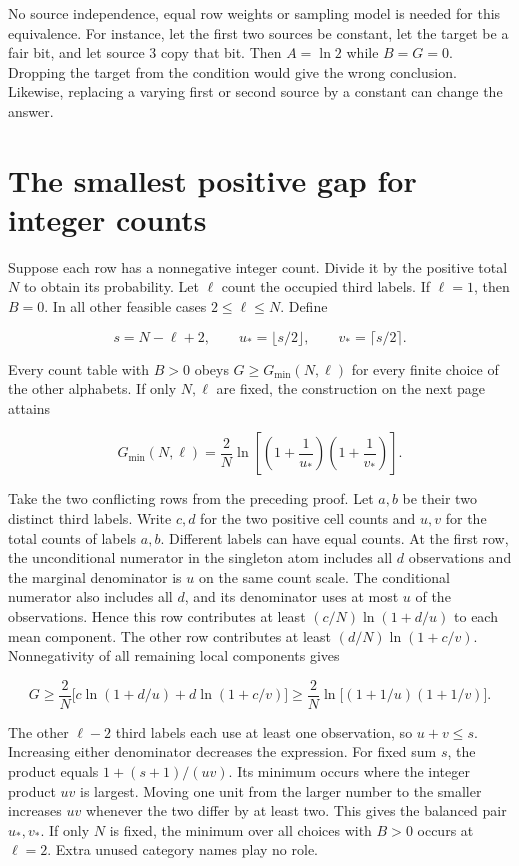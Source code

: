 No source independence, equal row weights or sampling model is needed for this equivalence. For instance, let the first two sources be constant, let the target be a fair bit, and let source 3 copy that bit. Then \(A=\ln 2\) while \(B=G=0\). Dropping the target from the condition would give the wrong conclusion. Likewise, replacing a varying first or second source by a constant can change the answer.

\clearpage

\section{The smallest positive gap for integer counts}\label{the-smallest-positive-gap-for-integer-counts}

Suppose each row has a nonnegative integer count. Divide it by the positive total \(N\) to obtain its probability. Let \(\ell\) count the occupied third labels. If \(\ell=1\), then \(B=0\). In all other feasible cases \(2\leq\ell\leq N\). Define

\[
s=N-\ell+2,\qquad u_*=\lfloor s/2\rfloor,\qquad v_*=\lceil s/2\rceil .
\]

Every count table with \(B>0\) obeys \(G\geq G_{\min}(N,\ell)\) for every finite choice of the other alphabets. If only \(N,\ell\) are fixed, the construction on the next page attains

\[
G_{\min}(N,\ell)=\frac{2}{N}\ln\!\left[
  \left(1+\frac{1}{u_*}\right)\left(1+\frac{1}{v_*}\right)\right].
\]

Take the two conflicting rows from the preceding proof. Let \(a,b\) be their two distinct third labels. Write \(c,d\) for the two positive cell counts and \(u,v\) for the total counts of labels \(a,b\). Different labels can have equal counts. At the first row, the unconditional numerator in the singleton atom includes all \(d\) observations and the marginal denominator is \(u\) on the same count scale. The conditional numerator also includes all \(d\), and its denominator uses at most \(u\) of the observations. Hence this row contributes at least \((c/N)\ln(1+d/u)\) to each mean component. The other row contributes at least \((d/N)\ln(1+c/v)\). Nonnegativity of all remaining local components gives

\[
G\geq\frac{2}{N}\bigl[c\ln(1+d/u)+d\ln(1+c/v)\bigr]
  \geq\frac{2}{N}\ln\bigl[(1+1/u)(1+1/v)\bigr].
\]

The other \(\ell-2\) third labels each use at least one observation, so \(u+v\leq s\). Increasing either denominator decreases the expression. For fixed sum \(s\), the product equals \(1+(s+1)/(uv)\). Its minimum occurs where the integer product \(uv\) is largest. Moving one unit from the larger number to the smaller increases \(uv\) whenever the two differ by at least two. This gives the balanced pair \(u_*,v_*\). If only \(N\) is fixed, the minimum over all choices with \(B>0\) occurs at \(\ell=2\). Extra unused category names play no role.

